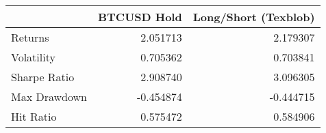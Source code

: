 \begin{tabular}{lrr}
\toprule
{} &  BTCUSD Hold &  Long/Short (Texblob) \\
\midrule
Returns      &     2.051713 &              2.179307 \\
Volatility   &     0.705362 &              0.703841 \\
Sharpe Ratio &     2.908740 &              3.096305 \\
Max Drawdown &    -0.454874 &             -0.444715 \\
Hit Ratio    &     0.575472 &              0.584906 \\
\bottomrule
\end{tabular}
